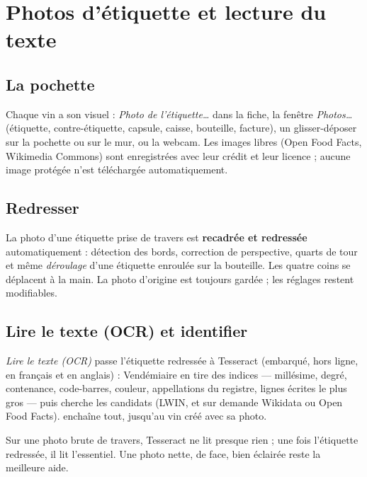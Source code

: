 \documentclass[11pt,a4paper]{article}
\begin{document}
\section{Photos d'étiquette et lecture du texte}
\subsection{La pochette}
Chaque vin a son visuel : \emph{Photo de l'étiquette…} dans la fiche, la fenêtre \emph{Photos…} (étiquette,
contre-étiquette, capsule, caisse, bouteille, facture), un glisser-déposer sur la pochette ou sur le mur,
ou la webcam. Les images libres (Open Food Facts, Wikimedia Commons) sont enregistrées avec leur crédit
et leur licence ; aucune image protégée n'est téléchargée automatiquement.

\subsection{Redresser}
La photo d'une étiquette prise de travers est \textbf{recadrée et redressée} automatiquement : détection
des bords, correction de perspective, quarts de tour et même \emph{déroulage} d'une étiquette enroulée
sur la bouteille. Les quatre coins se déplacent à la main. La photo d'origine est toujours gardée ; les
réglages restent modifiables.


\subsection{Lire le texte (OCR) et identifier}
\emph{Lire le texte (OCR)} passe l'étiquette redressée à Tesseract (embarqué, hors ligne, en français et en
anglais) : Vendémiaire en tire des indices — millésime, degré, contenance, code-barres, couleur,
appellations du registre, lignes écrites le plus gros — puis cherche les candidats (LWIN, et sur demande
Wikidata ou Open Food Facts).  enchaîne tout,
jusqu'au vin créé avec sa photo.


\begin{attention}
Sur une photo brute de travers, Tesseract ne lit presque rien ; une fois l'étiquette redressée, il lit
l'essentiel. Une photo nette, de face, bien éclairée reste la meilleure aide.
\end{attention}
\end{document}
